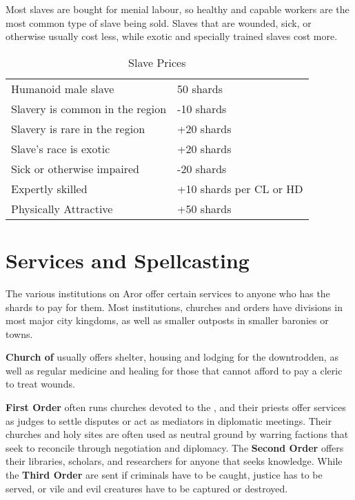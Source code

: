 Most slaves are bought for menial labour, so healthy and capable workers are
the most common type of slave being sold. Slaves that are wounded, sick, or
otherwise usually cost less, while exotic and specially trained slaves cost
more.

\begin{table*}
  \caption{Slave Prices} \label{tbl:Slave Prices}
  \begin{tabular}{p{10cm} l}
    Humanoid male slave             &  50 shards \\
    Slavery is common in the region & -10 shards \\
    Slavery is rare in the region   & +20 shards \\
    Slave's race is exotic          & +20 shards \\
    Sick or otherwise impaired      & -20 shards \\
    Expertly skilled                & +10 shards per CL or HD \\
    Physically Attractive           & +50 shards
  \end{tabular}
\end{table*}

\section{Services and Spellcasting}
\label{sec:Services}

The various institutions on Aror offer certain services to anyone who has the
shards to pay for them. Most institutions, churches and orders have divisions
in most major city kingdoms, as well as smaller outposts in smaller baronies
or towns.

\textbf{Church of } usually offers shelter, housing and
lodging for the downtrodden, as well as regular medicine and healing for those
that cannot afford to pay a cleric to treat wounds.

\textbf{First Order} often runs churches devoted to the ,
and their priests offer services as judges to settle disputes or act as
mediators in diplomatic meetings. Their churches and holy sites are often
used as neutral ground by warring factions that seek to reconcile through
negotiation and diplomacy. The \textbf{Second Order} offers their libraries,
scholars, and researchers for anyone that seeks knowledge. While the
\textbf{Third Order} are sent if criminals have to be caught, justice has to
be served, or vile and evil creatures have to be captured or destroyed.

